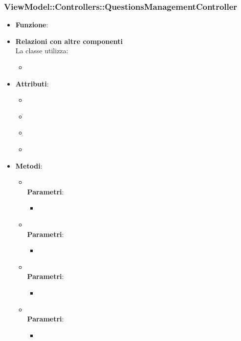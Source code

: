\subsubsection{ViewModel::Controllers::QuestionsManagementController}
\begin{itemize}
\item\textbf{Funzione}:
\item\textbf{Relazioni con altre componenti}\\
La classe utilizza:
	\begin{itemize}
		\item
	\end{itemize}
\item\textbf{Attributi}:
	\begin{itemize}
		\item\code{}\\
		\item\code{}\\
		\item\code{}\\
		\item\code{}\\
	\end{itemize}
\item\textbf{Metodi}:
	\begin{itemize}
		\item\code{}\\
		\textbf{Parametri}:
			\begin{itemize}
				\item\code{}\\
			\end{itemize}
		\item\code{}\\
		\textbf{Parametri}:
			\begin{itemize}
				\item\code{}\\
			\end{itemize}
		\item\code{}\\
		\textbf{Parametri}:
			\begin{itemize}
				\item\code{}\\
			\end{itemize}
		\item\code{}\\
		\textbf{Parametri}:
			\begin{itemize}
				\item\code{}\\
			\end{itemize}
	\end{itemize}
\end{itemize}

